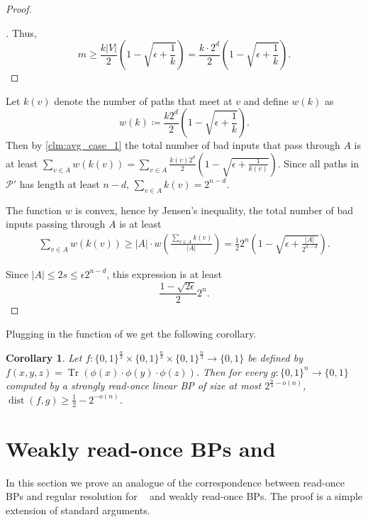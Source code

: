 \documentclass[10pt,a4paper]{article}
\newtheorem{corollary}[theorem]{Corollary}
\theoremstyle{definition}
\theoremstyle{remark}
\newenvironment{claimproof}[1][\proofname]{\begin{proof}[#1]\renewcommand*{\qedsymbol}{$\blacksquare$}}{\end{proof}}
\DeclareMathOperator{\dist}{dist}
\DeclareMathOperator{\Tr}{Tr}
\DeclareMathOperator{\reslin}{\mathsf{Res}[\oplus]}
\newcommand{\card}[1]{{\left|#1\right|}}
\newcommand{\Q}{{\{0,1\}}}
\newcommand{\calP}{\mathcal{P}}
\newcommand{\sreadonce}{strongly read-once}
\newcommand{\wreadonce}{weakly read-once}
\newcommand{\Wreadonce}{Weakly read-once}
\begin{document}
\begin{proof}
\begin{claimproof}
    Thus,
    \[
      m \ge \frac{k\card{V}}{2}\left(1 - \sqrt{\epsilon + \frac{1}{k}}\right) = \frac{k\cdot 2^d}{2}\left(1 - \sqrt{\epsilon + \frac{1}{k}}\right).
    \]
  \end{claimproof}

  Let $k(v)$ denote the number of paths that meet at $v$ and define $w(k)$ as
  \[
    w(k) \coloneqq \frac{k 2^d}{2}\left(1-\sqrt{\epsilon+\frac{1}{k}}\right).
  \]
  Then by \cref{clm:avg_case_1} the total number of bad inputs that pass through $A$ is at least $\sum_{v\in A} w(k(v)) = \sum_{v\in A} \frac{k(v) 2^d}{2}\left(1-\sqrt{\epsilon+\frac{1}{k(v)}}\right)$.
  Since all paths in $\calP'$ has length at least $n-d$, $\sum_{v \in A} k(v) = 2^{n-d}$.

  The function $w$ is convex, hence by Jensen's inequality, the total number of bad inputs passing through $A$ is at least
  \begin{align*}
    \sum_{v \in A} w(k(v)) \ge
    \card{A} \cdot w\left(\frac{\sum_{v \in A} k(v)}{\card{A}}\right) = \frac{1}{2} 2^n \left(1-\sqrt{\epsilon + \frac{\card{A}}{2^{n-d}}}\right).
  \end{align*}
  
  Since $\card{A} \le 2s \le \epsilon 2^{n-d}$, this expression is at least
  \[
    \frac{1-\sqrt{2\epsilon}}{2} 2^n.
  \]
\end{proof}


%

%
%
%
%
%

Plugging in the function of  we get the following corollary.

\begin{corollary}
Let $f:\Q^{\frac{n}{3}}\times \Q^{\frac{n}{3}} \times \Q^{\frac{n}{3}} \rightarrow \Q$ be defined by $f(x,y,z) = \Tr(\phi(x) \cdot \phi(y) \cdot \phi(z))$. Then for every $g:\Q^n \rightarrow \Q$ computed by a \sreadonce{} linear BP of size at most $2^{\frac{n}{3} - o(n)}$, $\dist(f, g) \ge \frac{1}{2} - 2^{-o(n)}$.
\end{corollary}

\section{\texorpdfstring{\Wreadonce{} BPs and $\reslin$}{\Wreadonce{} BPs and Res[+]}}

In this section we prove an analogue of the correspondence between read-once BPs and regular resolution for $\reslin$ and \wreadonce{} BPs. The proof is a simple extension of standard arguments.
\end{document}

